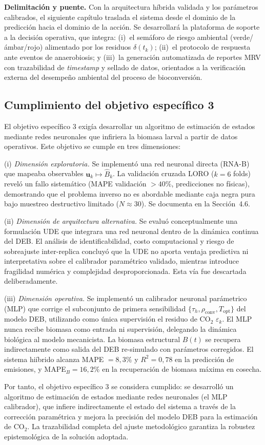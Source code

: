 \textbf{Delimitación y puente.} Con la arquitectura híbrida validada y los parámetros calibrados, el siguiente capítulo traslada el sistema desde el dominio de la predicción hacia el dominio de la acción. Se desarrollará la plataforma de soporte a la decisión operativa, que integra: (i)~el semáforo de riesgo ambiental (verde/ámbar/rojo) alimentado por los residuos $\delta(t_k)$; (ii)~el protocolo de respuesta ante eventos de anaerobiosis; y (iii)~la generación automatizada de reportes MRV con trazabilidad de \emph{timestamp} y sellado de datos, orientados a la verificación externa del desempeño ambiental del proceso de bioconversión.

\subsection*{Cumplimiento del objetivo específico 3}

El objetivo específico 3 exigía desarrollar un algoritmo de estimación de estados mediante redes neuronales que infiriera la biomasa larval a partir de datos operativos. Este objetivo se cumple en tres dimensiones:

(i) \textit{Dimensión exploratoria.} Se implementó una red neuronal directa (RNA-B) que mapeaba observables $\mathbf{u}_k \mapsto \hat{B}_k$. La validación cruzada LORO ($k=6$ folds) reveló un fallo sistemático (MAPE validación $>40\%$, predicciones no físicas), demostrando que el problema inverso no es abordable mediante caja negra pura bajo muestreo destructivo limitado ($N\approx 30$). Se documenta en la Sección~4.6.

(ii) \textit{Dimensión de arquitectura alternativa.} Se evaluó conceptualmente una formulación UDE que integrara una red neuronal dentro de la dinámica continua del DEB. El análisis de identificabilidad, costo computacional y riesgo de sobreajuste inter-replica concluyó que la UDE no aporta ventaja predictiva ni interpretativa sobre el calibrador paramétrico validado, mientras introduce fragilidad numérica y complejidad desproporcionada. Esta vía fue descartada deliberadamente.

(iii) \textit{Dimensión operativa.} Se implementó un calibrador neuronal parámetrico (MLP) que corrige el subconjunto de primera sensibilidad $\{\tau_h, \rho_{\mathrm{conv}}, T_{\mathrm{opt}}\}$ del modelo DEB, utilizando como única supervisión el residuo de CO$_2$ $\varepsilon_k$. El MLP nunca recibe biomasa como entrada ni supervisión, delegando la dinámica biológica al modelo mecanicista. La biomasa estructural $B(t)$ se recupera indirectamente como salida del DEB re-simulado con parámetros corregidos. El sistema hiíbrido alcanza MAPE $= 8{,}3\%$ y $R^2 = 0{,}78$ en la predicción de emisiones, y MAPE$_B = 16{,}2\%$ en la recuperación de biomasa máxima en cosecha.

Por tanto, el objetivo específico 3 se considera cumplido: se desarrolló un algoritmo de estimación de estados mediante redes neuronales (el MLP calibrador), que infiere indirectamente el estado del sistema a través de la corrección paramétrica y mejora la precisión del modelo DEB para la estimación de CO$_2$. La trazabilidad completa del ajuste metodológico garantiza la robustez epistemológica de la solución adoptada.

